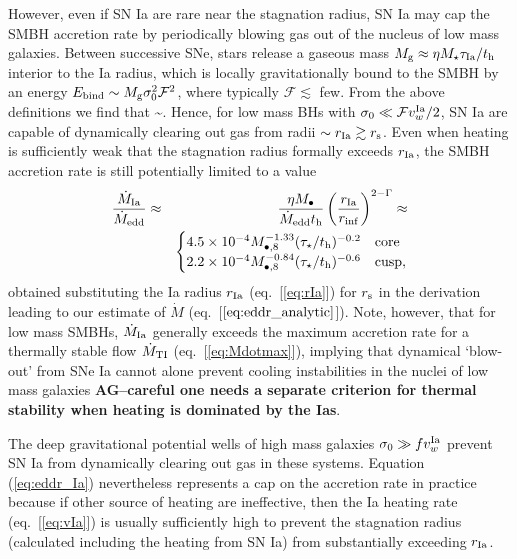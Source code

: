 \documentclass[usenatbib,fleqn]{mn2e}
\newcommand{\Mbheight}{M_{\bullet,8}}
\begin{document}
However, even if SN Ia are rare near the stagnation radius, SN Ia may cap the
SMBH accretion rate by periodically blowing gas out of the nucleus of
low mass galaxies.  Between successive SNe, stars release a
gaseous mass $M_{\rm g} \approx \eta M_{\star}\tau_{\rm Ia}/t_{\rm h}$
interior to the Ia radius, which is locally gravitationally bound to the SMBH
by an energy $E_{\rm bind} \sim M_{\rm g}\sigma_0^{2}\mathcal{F}^{2}$, where typically $\mathcal{F} 
\lesssim$ few.  From the above definitions we find that 
\be
{} \sim {}.  
\label{eq:blowout}
\ee
Hence, for low mass BHs with $\sigma_0 \ll \mathcal{F}v^{\rm Ia}_{w}/2$, SN Ia are capable of dynamically clearing out gas from radii $\sim r_{\rm Ia} \gtrsim r_{\rm s}$.  Even when heating is sufficiently weak that the stagnation radius formally exceeds $r_{\rm Ia}$, the SMBH accretion rate is still potentially limited to a value
\begin{eqnarray}
\frac{\dot{M}_{\rm Ia}}{\dot{M}_{\rm edd}} &\approx& \frac{\eta M_{\bullet}}{\dot{M}_{\rm edd} t_{\rm h}}\left(\frac{r_{\rm Ia}}{r_{\rm inf}}\right)^{2-\Gamma} \approx \nonumber \\
 && \begin{cases}
    4.5 \times 10^{-4} M_{\bullet,8}^{-1.33}(\tau_{\star}/t_{\rm h})^{-0.2}
   & \text{core} \\
    2.2 \times 10^{-4} \Mbheight^{-0.84}(\tau_{\star}/t_{\rm h})^{-0.6}   & \text{cusp},
  \end{cases}
  \label{eq:eddr_Ia}
\end{eqnarray}
obtained substituting the Ia radius $r_{\rm Ia}$ (eq.~[\ref{eq:rIa}])
for $r_{\rm s}$ in the derivation leading to our estimate of $\dot{M}$
(eq.~[$\ref{eq:eddr_analytic}$]).  Note, however, that for low mass
SMBHs, $\dot{M}_{\rm Ia}$ generally exceeds the maximum accretion rate
for a thermally stable flow $\dot{M}_{\rm TI}$
(eq.~[\ref{eq:Mdotmax}]), implying that dynamical `blow-out' from SNe
Ia cannot alone prevent cooling instabilities in the nuclei of low
mass galaxies {\bf AG--careful one needs a separate criterion for
  thermal stability when heating is dominated by the Ias}. 

The deep gravitational potential wells of high mass galaxies $\sigma_0
\gg f v^{\rm Ia}_{w}$ prevent SN Ia from dynamically clearing out gas
in these systems.  Equation (\ref{eq:eddr_Ia}) nevertheless represents
a cap on the accretion rate in practice because if other source of
heating are ineffective, then the Ia heating rate (eq.~[\ref{eq:vIa}])
is usually sufficiently high to prevent the stagnation radius
(calculated including the heating from SN Ia) from substantially
exceeding $r_{\rm Ia}$.
\end{document}
